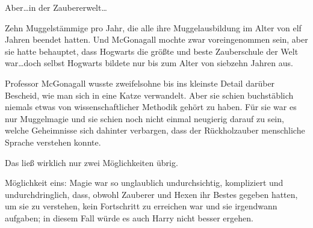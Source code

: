 Aber…in der Zaubererwelt…

Zehn Muggelstämmige pro Jahr, die alle ihre Muggelausbildung im Alter von elf Jahren beendet hatten. Und McGonagall mochte zwar voreingenommen sein, aber sie hatte behauptet, dass Hogwarts die größte und beste Zauberschule der Welt war…doch selbst Hogwarts bildete nur bis zum Alter von siebzehn Jahren aus.

Professor McGonagall wusste zweifelsohne bis ins kleinste Detail darüber Bescheid, wie man sich in eine Katze verwandelt. Aber sie schien buchstäblich niemals etwas von wissenschaftlicher Methodik gehört zu haben. Für sie war es nur Muggelmagie und sie schien noch nicht einmal neugierig darauf zu sein, welche Geheimnisse sich dahinter verbargen, dass der Rückholzauber menschliche Sprache verstehen konnte.

Das ließ wirklich nur zwei Möglichkeiten übrig.

Möglichkeit eins: Magie war so unglaublich undurchsichtig, kompliziert und undurchdringlich, dass, obwohl Zauberer und Hexen ihr Bestes gegeben hatten, um sie zu verstehen, kein Fortschritt zu erreichen war und sie irgendwann aufgaben; in diesem Fall würde es auch Harry nicht besser ergehen.

